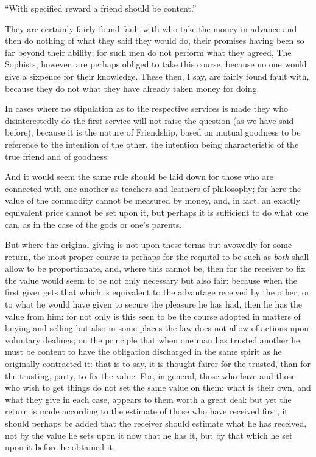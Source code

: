 “With specified reward a friend should be content.”

They are certainly fairly found fault with who take the money in advance and
then do nothing of what they said they would do, their promises having been so
far beyond their ability; for such men do not perform what they agreed, The
Sophists, however, are perhaps obliged to take this course, because no one
would give a sixpence for their knowledge. These then, I say, are fairly found
fault with, because they do not what they have already taken money for doing.

In cases where no stipulation as to the respective services is made they who
disinterestedly do the first service will not raise the question (as we have
said before), because it is the nature of Friendship, based on mutual goodness
to be reference to the intention of the other, the intention being
characteristic of the true friend and of goodness.

And it would seem the same rule should be laid down for those who are connected
with one another as teachers and learners of philosophy; for here the value of
the commodity cannot be measured by money, and, in fact, an exactly equivalent
price cannot be set upon it, but perhaps it is sufficient to do what one can,
as in the case of the gods or one’s parents.

But where the original giving is not upon these terms but avowedly for some
return, the most proper course is perhaps for the requital to be such as
\emph{both} shall allow to be proportionate, and, where this cannot be, then
for the receiver to fix the value would seem to be not only necessary but also
fair: because when the first giver gets that which is equivalent to the
advantage received by the other, or to what he would have given to secure the
pleasure he has had, then he has the value from him: for not only is this seen
to be the course adopted in matters of buying and selling but also in some
places the law does not allow of actions upon voluntary dealings; on the
principle that when one man has trusted another he must be content to have the
obligation discharged in the same spirit as he originally contracted it: that
is to say, it is thought fairer for the trusted, than for the trusting, party,
to fix the value. For, in general, those who have and those who wish to get
things do not set the same value on them: what is their own, and what they give
in each case, appears to them worth a great deal: but yet the return is made
according to the estimate of those who have received first, it should perhaps
be added that the receiver should estimate what he has received, not by the
value he sets upon it now that he has it, but by that which he set upon it
before he obtained it.

